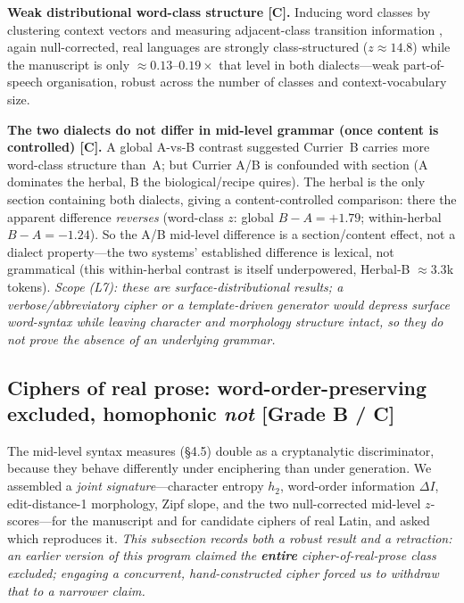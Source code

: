 \documentclass[11pt]{article}
\newcommand{\grade}[1]{{\small\textbf{[#1]}}}
\begin{document}
\textbf{Weak distributional word-class structure \grade{C}.} Inducing word classes by
clustering context vectors and measuring adjacent-class transition information
\citep{brown1992class}, again null-corrected, real languages are strongly
class-structured ($z\approx14.8$) while the manuscript is only $\approx\!0.13$--$0.19\times$
that level in both dialects---weak part-of-speech organisation, robust across the number
of classes and context-vocabulary size.

\textbf{The two dialects do not differ in mid-level grammar (once content is
controlled) \grade{C}.} A global A-vs-B contrast suggested Currier~B carries more
word-class structure than~A; but Currier A/B is confounded with section (A dominates the
herbal, B the biological/recipe quires). The herbal is the only section containing both
dialects, giving a content-controlled comparison: there the apparent difference
\emph{reverses} (word-class $z$: global $B-A=+1.79$; within-herbal $B-A=-1.24$). So the
A/B mid-level difference is a section/content effect, not a dialect property---the two
systems' established difference is lexical, not grammatical (this within-herbal contrast
is itself underpowered, Herbal-B $\approx3.3$k tokens). \emph{Scope (L7): these are
surface-distributional results; a verbose/abbreviatory cipher or a template-driven
generator would depress surface word-syntax while leaving character and morphology
structure intact, so they do not prove the absence of an underlying grammar.}

\subsection{Ciphers of real prose: word-order-preserving excluded, homophonic \emph{not}
\grade{Grade B / C}}
The mid-level syntax measures (\S4.5) double as a cryptanalytic discriminator, because they
behave differently under enciphering than under generation. We assembled a \emph{joint
signature}---character entropy $h_2$, word-order information $\Delta I$, edit-distance-1
morphology, Zipf slope, and the two null-corrected mid-level $z$-scores---for the manuscript
and for candidate ciphers of real Latin, and asked which reproduces it. \emph{This subsection
records both a robust result and a retraction: an earlier version of this program claimed the
\textbf{entire} cipher-of-real-prose class excluded; engaging a concurrent, hand-constructed
cipher forced us to withdraw that to a narrower claim.}
\end{document}
